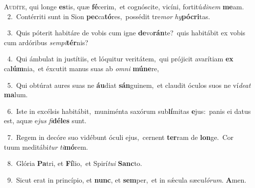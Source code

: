 \lettrine{\initial\textcolor{\initialcolor}{A}}{udíte,} qui longe \textbf{es}\-tis, quæ \textbf{fé}\-cerim,~\star et cognóscite, vicíni, fortitú\-\textit{di}\-\textit{nem} \textbf{me}\-am.\\
{\numbfont\textcolor{\numbcolor}{~2.}}~Contérriti sunt in Sion \textbf{pec}\-ca\-\textbf{tó}\-res,~\star possédit tre\textit{mor} \textit{hy}\-\textbf{pó}\textbf{cri}tas.\par
{\numbfont\textcolor{\numbcolor}{~3.}}~Quis póterit habitáre de vobis cum igne \textbf{de}\-vo\-\textbf{rán}\-te?~\star quis habitábit ex vobis cum ardóribus \textit{sem}\-\textit{pi}\textbf{tér}nis?\par
{\numbfont\textcolor{\numbcolor}{~4.}}~Qui ámbulat in justítiis, et lóquitur veritátem,~\dagger qui prójicit avarítiam \textbf{ex} ca\-\textbf{lúm}\-nia,~\star et éxcutit manus suas ab \textit{om}\-\textit{ni} \textbf{mú}\-\textbf{ne}re,\par
{\numbfont\textcolor{\numbcolor}{~5.}}~Qui obtúrat aures suas ne \textbf{áu}\-diat \textbf{sán}\-guinem,~\star et claudit óculos suos ne ví\-\textit{de}\-\textit{at} \textbf{ma}\-lum.\par
{\numbfont\textcolor{\numbcolor}{~6.}}~Iste in excélsis habitábit,~\dagger muniménta saxórum sub\-\textbf{lí}\-mitas \textbf{e}\-jus:~\star panis ei datus est, aquæ e\textit{jus} \textit{fi}\-\textbf{dé}\textbf{les} sunt.\par
{\numbfont\textcolor{\numbcolor}{~7.}}~Regem in decóre suo vidébunt óculi ejus,~\dagger cernent \textbf{ter}\-ram de \textbf{lon}\-ge.~\star Cor tuum meditábi\textit{tur} \textit{ti}\-\textbf{mó}rem.\par
{\numbfont\textcolor{\numbcolor}{~8.}}~Glória \textbf{Pa}\-tri, et \textbf{Fí}\-lio,~\star et Spirí\-\textit{tu}\-\textit{i} \textbf{Sanc}\-to.\par
{\numbfont\textcolor{\numbcolor}{~9.}}~Sicut erat in princípio, et \textbf{nunc}\-, et \textbf{sem}\-per,~\star et in sǽcula sæcu\-\textit{ló}\-\textit{rum}. \textbf{A}\-men.\par
